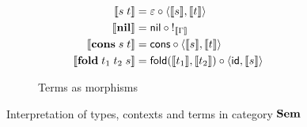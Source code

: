 \begin{figure}
\begin{subfigure}{0.8\linewidth}
\begin{align*}
  \\
  \sem{\tmApp{s}{t}} &= \eval \comp \prodM{\sem{s}}{\sem{t}}
  \\
  \sem{\tmNil} &= \nil \comp {!_{\sem{\Gamma}}}
  \\
  \sem{\tmCons{s}{t}} &= \cons \comp \prodM{\sem{s}}{\sem{t}}
  \\
  \sem{\tmFoldList{t_1}{t_2}{s}} &= \fold(\sem{t_1},\sem{t_2}) \comp \prodM{\id}{\sem{s}}
  \end{align*}
  \caption{Terms as morphisms}
  \label{fig:semantics:terms}
\end{subfigure}
\caption{Interpretation of types, contexts and terms in category $\Sem$}
\end{figure}
